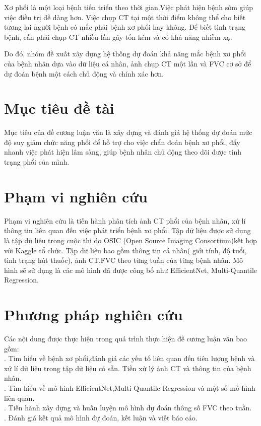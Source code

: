 Xơ phổi là một loại bệnh tiến triển theo thời gian.Việc phát hiện bệnh sớm giúp việc điều trị dễ dàng hơn. Việc chụp CT tại một thời điểm không thể cho biết tương lai người bệnh có mắc phải bệnh xơ phổi hay không. Để biết tình trạng bệnh, cần phải chụp CT nhiều lần gây tốn kém và có khả năng nhiễm xạ. \par
Do đó, nhóm đề xuất xây dựng hệ thống dự đoán khả năng mắc bệnh xơ phổi của bệnh nhân dựa vào dữ liệu cá nhân, ảnh chụp CT một lần và FVC cơ sở để dự đoán bệnh một cách chủ động và chính xác hơn.\par
\section{Mục tiêu đề tài}
Mục tiêu của đề cương luận văn là xây dựng và đánh giá hệ thống dự đoán mức độ suy giảm chức năng phổi để hỗ trợ cho việc chẩn đoán bệnh xơ phổi, đẩy nhanh việc phát hiện lâm sàng, giúp bệnh nhân chủ động theo dõi được tình trạng phổi của mình.

\section{Phạm vi nghiên cứu}
Phạm vi nghiên cứu là tiến hành phân tích ảnh CT phổi của bệnh nhân, xử lí thông tin liên quan đến việc phát triển bệnh xơ phổi. Tập dữ liệu được sử dụng là tập dữ liệu trong cuộc thi do OSIC (Open Source Imaging Consortium)kết hợp với Kaggle tổ chức. Tập dữ liệu bao gồm thông tin cá nhân( giới tính, độ tuổi, tình trạng hút thuốc), ảnh CT,FVC theo từng tuần của từng bệnh nhân. Mô hình sẽ sử dụng là các mô hình đã được công bố như EfficientNet, Multi-Quantile Regression.
\section{Phương pháp nghiên cứu}
Các nội dung được thực hiện trong quá trình thực hiện đề cương luận văn bao gồm:\\
. Tìm hiểu về bệnh xơ phổi,đánh giá các yếu tố liên quan đến tiên lượng bệnh và xử lí dữ liệu trong tập dữ liệu có sẵn. Tiền xử lý ảnh CT và thông tin của bệnh nhân.\\
. Tìm hiểu về mô hình EfficientNet,Multi-Quantile Regression và một số mô hình liên quan.\\
. Tiến hành xây dựng và huấn luyện mô hình dự đoán thông số FVC theo tuần.\\
. Đánh giá kết quả mô hình đự đoán, kết luận và viết báo cáo.\\